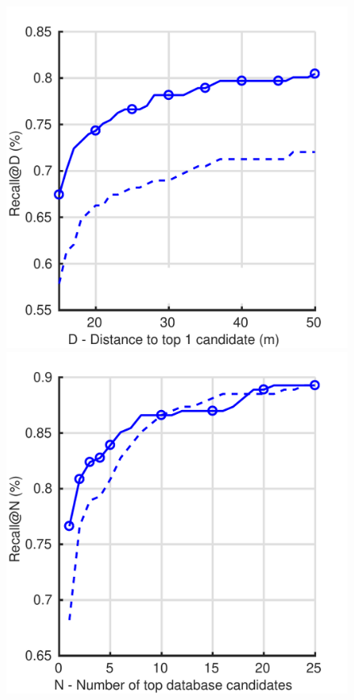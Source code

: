 \begin{figure}
	\center
	\begin{minipage}{0.49\linewidth}
		\includegraphics[width=\linewidth]{plot/full_vs_trunc/rgb_r_trunc_distance}	
	\end{minipage}
	\begin{minipage}{0.49\linewidth}
		\includegraphics[width=\linewidth]{plot/full_vs_trunc/rgb_r_trunc_recall}	
	\end{minipage}
	

\end{figure}
